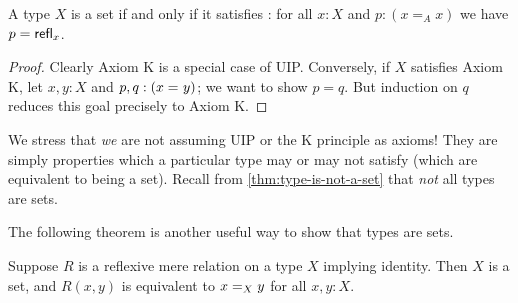\begin{thm}\label{thm:h-set-uip-K}
 A type $X$ is a set if and only if it satisfies :
 for all $x : X$ and $p : (x =_A x)$ we have $p = \refl{x}$.
\end{thm}

\begin{proof}
  Clearly Axiom K is a special case of UIP.
  Conversely, if $X$ satisfies Axiom K, let $x, y : X$ and $p, q : (\id{x}{y})$; we want to show $p=q$.
  But induction on $q$ reduces this goal precisely to Axiom K.
\end{proof}

We stress that \emph{we} are not assuming UIP or the K principle as axioms!
They are simply properties which a particular type may or may not satisfy (which are equivalent to being a set).
Recall from \autoref{thm:type-is-not-a-set} that \emph{not} all types are sets.

The following theorem is another useful way to show that types are sets.

\begin{thm}\label{thm:h-set-refrel-in-paths-sets}
  Suppose $R$ is a reflexive mere relation on a type $X$ implying identity.
  Then $X$ is a set, and $R(x,y)$ is equivalent to $\id[X]{x}{y}$ for all $x,y:X$.
\end{thm}


